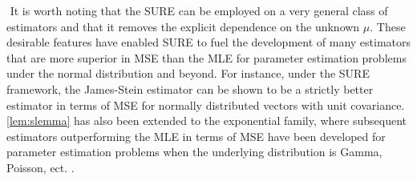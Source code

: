 $ $\newline
It is worth noting that the SURE can be employed on a very general class of estimators and that it removes the explicit dependence on the unknown $\mu$. These desirable features have enabled SURE to fuel the development of many estimators that are more superior in MSE than the MLE for parameter estimation problems under the normal distribution and beyond. For instance, under the SURE framework, the James-Stein estimator \citep{james1992estimation} can be shown to be a strictly better estimator in terms of MSE for normally distributed vectors with unit covariance. \cref{lem:slemma} has also been extended to the exponential family, where subsequent estimators outperforming the MLE in terms of MSE have been developed for parameter estimation problems when the underlying distribution is Gamma, Poisson, ect. \citep{hudson1978natural,peng1975simultaneous,tsui1978simultaneous}.

